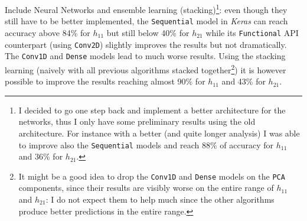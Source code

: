 Include Neural Networks and ensemble learning (stacking)\footnote{I decided to go one step back and implement a better architecture for the networks, thus I only have some preliminary results using the old architecture. For instance with a better (and quite longer analysis) I was able to improve also the \texttt{Sequential} models and reach 88\% of accuracy for $h_{11}$ and 36\% for $h_{21}$.}: even though they still have to be better implemented, the \texttt{Sequential} model in \textit{Keras} can reach accuracy above 84\% for $h_{11}$ but still below 40\% for $h_{21}$ while its \texttt{Functional} API counterpart (using \texttt{Conv2D}) slightly improves the results but not dramatically. The \texttt{Conv1D} and \texttt{Dense} models lead to much worse results. Using the stacking learning (naively with all previous algorithms stacked together\footnote{It  might be a good idea to drop the \texttt{Conv1D} and \texttt{Dense} models on the \texttt{PCA} components, since their results are visibly worse on the entire range of $h_{11}$ and $h_{21}$: I do not expect them to help much since the other algorithms produce better predictions in the entire range.}) it is however possible to improve the results reaching almost 90\% for $h_{11}$ and 43\% for $h_{21}$.